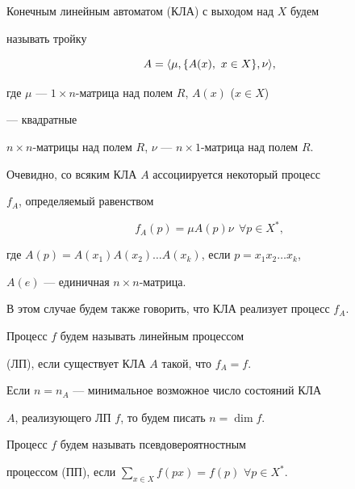 \begin{defn}


Конечным линейным автоматом (КЛА) с выходом над $X$ будем


называть тройку


$$


A=\la\mu,\{A(x),\ x\in X\},\nu\ra,


$$


где $\mu$ --- $1\times n$-матрица над полем $R$, $A(x)$ ($x\in X$)


--- квадратные


$n\times n$-матрицы над полем $R$, $\nu$ --- $n\times1$-матрица над полем $R$.


\end{defn}





Очевидно, со всяким КЛА $A$ ассоциируется некоторый процесс


$f_A$, определяемый равенством


$$


f_A(p)=\mu A(p)\nu\ \ \forall p\in X^*,


$$


где $A(p)=A(x_1)A(x_2)\dotsc A(x_k)$, если $p=x_1x_2\dotsc x_k$,


$A(e)$ --- единичная $n\times n$-матрица.





В этом случае будем также говорить, что КЛА реализует процесс $f_A$.





\begin{defn}


Процесс $f$ будем называть линейным процессом


(ЛП), если существует КЛА $A$ такой, что $f_A=f$.


\end{defn}





Если $n=n_A$ --- минимальное возможное число состояний КЛА


$A$, реализующего ЛП $f$, то будем писать $n=\dim f$.





\begin{defn}


Процесс $f$ будем называть псевдовероятностным 


процессом (ПП), если $\sum\limits_{x\in X}f(px)=f(p)$ \; $\forall p\in X^*$.


\end{defn}





